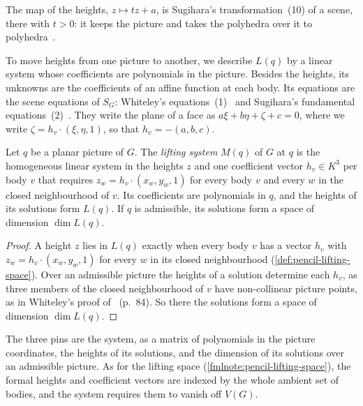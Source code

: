 The map of the heights, $z \mapsto tz + a$, is Sugihara's
transformation~(10) of a scene, there with $t > 0$: it keeps the picture
and takes the polyhedra over it to polyhedra~\cite[p.~85]{sugihara1984}.

To move heights from one picture to another, we describe $L(q)$ by a
linear system whose coefficients are polynomials in the picture. Besides
the heights, its unknowns are the coefficients of an affine function at
each body. Its equations are the scene equations of $S_G$: Whiteley's
equations~(1)~\cite[p.~272]{whiteley1984} and Sugihara's fundamental
equations~(2)~\cite[p.~80]{sugihara1984}. They write the plane of a
face as $a\xi + b\eta + \zeta + c = 0$, where we write
$\zeta = h_v \cdot (\xi, \eta, 1)$, so that $h_v = -(a, b, c)$.

\begin{definition}
  \label{def:pencil-lifting-system}
  \leanok
  Let $q$ be a planar picture of $G$. The \emph{lifting system} $M(q)$
  of $G$ at $q$ is the homogeneous linear system in the heights $z$ and
  one coefficient vector $h_v \in K^3$ per body $v$ that requires
  $z_w = h_v \cdot (x_w, y_w, 1)$ for every body $v$ and every $w$ in
  the closed neighbourhood of $v$. Its coefficients are polynomials in
  $q$, and the heights of its solutions form $L(q)$. If $q$ is
  admissible, its solutions form a space of dimension $\dim L(q)$.
\end{definition}
\begin{proof}
  \leanok
  A height $z$ lies in $L(q)$ exactly when every body $v$ has a vector
  $h_v$ with $z_w = h_v \cdot (x_w, y_w, 1)$ for every $w$ in its closed
  neighbourhood (\cref{def:pencil-lifting-space}). Over an admissible
  picture the heights of a solution determine each $h_v$, as three
  members of the closed neighbourhood of $v$ have non-collinear picture
  points, as in Whiteley's proof of~\cite[Theorem~3.1]{whiteley1989}
  (p.~84). So there the solutions form a space of dimension $\dim L(q)$.
\end{proof}
\begin{fmlnote}
  The three pins are the system, as a matrix of polynomials in the
  picture coordinates, the heights of its solutions, and the dimension
  of its solutions over an admissible picture. As for the lifting space
  (\cref{fmlnote:pencil-lifting-space}), the formal heights and
  coefficient vectors are indexed by the whole ambient set of bodies,
  and the system requires them to vanish off $V(G)$.
\end{fmlnote}

